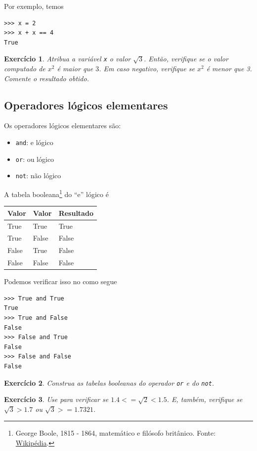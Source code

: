 \documentclass[12pt]{article}
\newtheorem{exr}{Exercício}[section]
\begin{document}
Por exemplo, temos
\begin{lstlisting}
>>> x = 2
>>> x + x == 4
True
\end{lstlisting}

\begin{exr}
  Atribua a variável \lstinline+x+ o valor $\sqrt{3}$. Então, verifique se o valor computado de $x^2$ é maior que $3$. Em caso negativo, verifique se $x^2$ é menor que 3. Comente o resultado obtido.
\end{exr}

\subsection{Operadores lógicos elementares}

Os operadores lógicos elementares são:
\begin{itemize}
\item[]\lstinline+and+: e lógico
\item[]\lstinline+or+: ou lógico
\item[]\lstinline+not+: não lógico
\end{itemize}

A tabela booleana\footnote{George Boole, 1815 - 1864, matemático e filósofo britânico. Fonte: \href{https://pt.wikipedia.org/wiki/George\_Boole}{Wikipédia}.} do ``e'' lógico é
\begin{center}
  \begin{tabular}[H]{ll|l}
    Valor & Valor & Resultado \\\hline
    True & True & True \\
    True & False & False \\
    False & True & False \\
    False & False & False \\\hline
  \end{tabular}
\end{center}
Podemos verificar isso no {\python} como segue
\begin{lstlisting}
>>> True and True
True
>>> True and False
False
>>> False and True
False
>>> False and False
False
\end{lstlisting}

\begin{exr}
  Construa as tabelas booleanas do operador \lstinline+or+ e do \lstinline+not+.
\end{exr}

\begin{exr}
  Use {\python} para verificar se $1.4 <= \sqrt{2} < 1.5$. E, também, verifique se $\sqrt{3} > 1.7$ ou $\sqrt{3} >= 1.7321$.
\end{exr}
\end{document}
